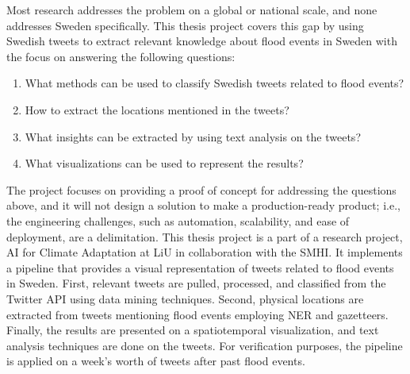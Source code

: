 Most research addresses the problem on a global or national scale, and none addresses Sweden
specifically. This thesis project covers this gap by using Swedish tweets to extract relevant
knowledge about flood events in Sweden with the focus on answering the following questions:
\begin{enumerate} 
  \item What methods can be used to classify Swedish tweets related to flood events?
  \item How to extract the locations mentioned in the tweets? 
  \item What insights can be extracted by using text analysis on the tweets?
  \item What visualizations can be used to represent the results? 
\end{enumerate}

The project focuses on providing a proof of concept for addressing the questions above, and it will
not design a solution to make a production-ready product; i.e., the engineering challenges, such as
automation, scalability, and ease of deployment, are a delimitation. This thesis project is a part
of a research project, AI for Climate Adaptation \cite{nesetAI4ClimateAdaptation} at \ac{LiU} in
collaboration with the \ac{SMHI}. It implements a pipeline that provides a visual representation of
tweets related to flood events in Sweden. First, relevant tweets are pulled, processed, and
classified from the Twitter API using data mining techniques. Second, physical locations are
extracted from tweets mentioning flood events employing \ac{NER} and gazetteers. Finally, the
results are presented on a spatiotemporal visualization, and text analysis techniques are done on
the tweets. For verification purposes, the pipeline is applied on a week's worth of tweets after
past flood events.
